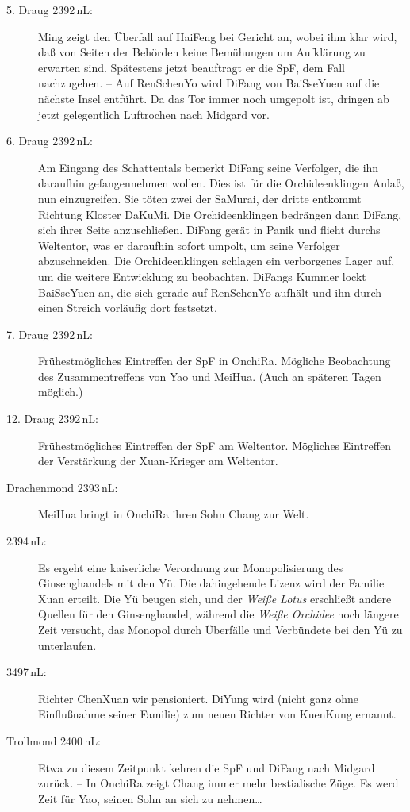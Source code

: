 \documentclass[
a4paper,
twoside,
DIV=calc,
BCOR=4mm,
fontsize=9pt,
twocolumn=on,
titlepage=on,
parskip=half
]{scrartcl}
\begin{document}
\begin{description}
\item[5. Draug 2392\,nL:] Ming zeigt den Überfall auf HaiFeng bei
  Gericht an, wobei ihm klar wird, daß von Seiten der Behörden keine
  Bemühungen um Aufklärung zu erwarten sind. Spätestens jetzt
  beauftragt er die SpF, dem Fall nachzugehen. -- Auf RenSchenYo wird
  DiFang von BaiSseYuen auf die nächste Insel entführt. Da das Tor
  immer noch umgepolt ist, dringen ab jetzt gelegentlich Luftrochen
  nach Midgard vor.
\item[6. Draug 2392\,nL:] Am Eingang des Schattentals bemerkt DiFang
  seine Verfolger, die ihn daraufhin gefangennehmen wollen. Dies ist
  für die Orchideenklingen Anlaß, nun einzugreifen. Sie töten zwei der
  SaMurai, der dritte entkommt Richtung Kloster DaKuMi. Die
  Orchideenklingen bedrängen dann DiFang, sich ihrer Seite
  anzuschließen. DiFang gerät in Panik und flieht durchs Weltentor,
  was er daraufhin sofort umpolt, um seine Verfolger
  abzuschneiden. Die Orchideenklingen schlagen ein verborgenes Lager
  auf, um die weitere Entwicklung zu beobachten. DiFangs Kummer lockt
  BaiSseYuen an, die sich gerade auf RenSchenYo aufhält und ihn durch
  einen Streich vorläufig dort festsetzt.
\item[7. Draug 2392\,nL:] Frühestmögliches Eintreffen der SpF in
  OnchiRa. Mögliche Beobachtung des Zusammentreffens von Yao und
  MeiHua. (Auch an späteren Tagen möglich.)
\item[12. Draug 2392\,nL:] Frühestmögliches Eintreffen der SpF am
  Weltentor. Mögliches Eintreffen der Verstärkung der Xuan-Krieger am
  Weltentor.
\item[Drachenmond 2393\,nL:] MeiHua bringt in OnchiRa ihren Sohn
  Chang zur Welt.
\item[2394\,nL:] Es ergeht eine kaiserliche Verordnung zur
  Monopolisierung des Ginsenghandels mit den Yü. Die dahingehende
  Lizenz wird der Familie Xuan erteilt. Die Yü beugen sich, und der
  \emph{Weiße Lotus} erschließt andere Quellen für den Ginsenghandel,
  während die \emph{Weiße Orchidee} noch längere Zeit versucht, das
  Monopol durch Überfälle und Verbündete bei den Yü zu unterlaufen.
\item[3497\,nL:] Richter ChenXuan wir pensioniert. DiYung wird (nicht
  ganz ohne Einflußnahme seiner Familie) zum neuen Richter von
  KuenKung ernannt.
\item[Trollmond 2400\,nL:] Etwa zu diesem Zeitpunkt kehren die SpF
  und DiFang nach Midgard zurück. -- In OnchiRa zeigt Chang immer mehr
  bestialische Züge. Es werd Zeit für Yao, seinen Sohn an sich zu
  nehmen\dots
\end{description}
\end{document}
